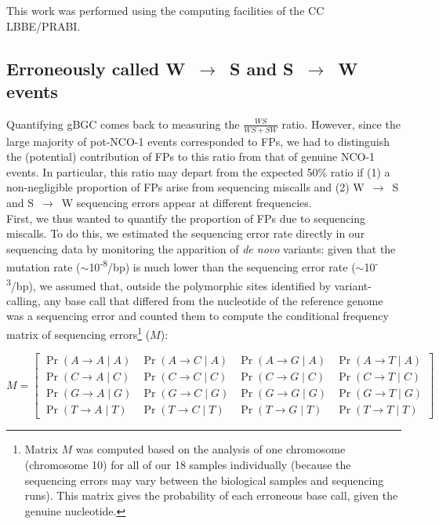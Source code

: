 This work was performed using the computing facilities of the CC LBBE/PRABI\@.


\subsection{Erroneously called W~$\rightarrow$~S and S~$\rightarrow$~W events}

Quantifying gBGC comes back to measuring the $\frac{WS}{WS+SW}$ ratio.
However, since the large majority of pot-NCO-1 events corresponded to FPs, we had to distinguish the (potential) contribution of FPs to this ratio from that of genuine NCO-1 events.
In particular, this ratio may depart from the expected 50\% ratio if (1) a non-negligible proportion of FPs arise from sequencing miscalls and (2) W~$\rightarrow$~S and S~$\rightarrow$~W sequencing errors appear at different frequencies.\\

First, we thus wanted to quantify the proportion of FPs due to sequencing miscalls.
To do this, we estimated the sequencing error rate directly in our sequencing data by monitoring the apparition of \textit{de novo} variants:
given that the mutation rate ($\sim$10\textsuperscript{-8}/bp) is much lower than the sequencing error rate ($\sim$10\textsuperscript{-3}/bp), we assumed that, outside the polymorphic sites identified by variant-calling, any base call that differed from the nucleotide of the reference genome was a sequencing error and counted them to compute the conditional frequency matrix of sequencing errors\footnote{Matrix $M$ was computed based on the analysis of one chromosome (chromosome 10) for all of our 18 samples individually (because the sequencing errors may vary between the biological samples and sequencing runs). This matrix gives the probability of each erroneous base call, given the genuine nucleotide.} ($M$):

\begin{equation*}
M = \begin{bmatrix}
\Pr( A\rightarrow A \mid A) & \Pr( A\rightarrow C \mid A) & \Pr( A\rightarrow G \mid A) & \Pr( A\rightarrow T \mid A) \\
\Pr( C\rightarrow A \mid C) & \Pr( C\rightarrow C \mid C) & \Pr( C\rightarrow G \mid C) & \Pr( C\rightarrow T \mid C) \\
\Pr( G\rightarrow A \mid G) & \Pr( G\rightarrow C \mid G) & \Pr( G\rightarrow G \mid G) & \Pr( G\rightarrow T \mid G) \\
\Pr( T\rightarrow A \mid T) & \Pr( T\rightarrow C \mid T) & \Pr( T\rightarrow G \mid T) & \Pr( T\rightarrow T \mid T) 
\end{bmatrix}
\end{equation*}






